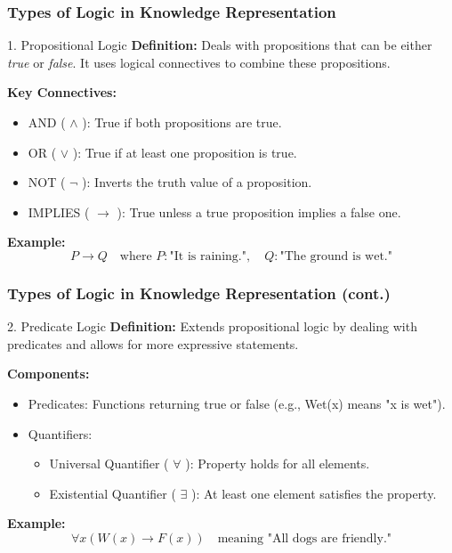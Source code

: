 \documentclass[aspectratio=169]{beamer}
\begin{document}
\begin{frame}[fragile]
    \frametitle{Types of Logic in Knowledge Representation}
    
    \begin{block}{1. Propositional Logic}
        \textbf{Definition:} Deals with propositions that can be either \textit{true} or \textit{false}. It uses logical connectives to combine these propositions.
        
        \textbf{Key Connectives:}
        \begin{itemize}
            \item AND ( $\land$ ): True if both propositions are true.
            \item OR ( $\lor$ ): True if at least one proposition is true.
            \item NOT ( $\neg$ ): Inverts the truth value of a proposition.
            \item IMPLIES ( $\rightarrow$ ): True unless a true proposition implies a false one.
        \end{itemize}
        
        \textbf{Example:}
        \[
        P \rightarrow Q \quad \text{where } P: \text{"It is raining."}, \quad Q: \text{"The ground is wet."}
        \]
    \end{block}
\end{frame}

\begin{frame}[fragile]
    \frametitle{Types of Logic in Knowledge Representation (cont.)}
    
    \begin{block}{2. Predicate Logic}
        \textbf{Definition:} Extends propositional logic by dealing with predicates and allows for more expressive statements.
        
        \textbf{Components:}
        \begin{itemize}
            \item Predicates: Functions returning true or false (e.g., Wet(x) means "x is wet").
            \item Quantifiers:
                \begin{itemize}
                    \item Universal Quantifier ( $\forall$ ): Property holds for all elements.
                    \item Existential Quantifier ( $\exists$ ): At least one element satisfies the property.
                \end{itemize}
        \end{itemize}
        
        \textbf{Example:}
        \[
        \forall x (W(x) \rightarrow F(x)) \quad \text{meaning "All dogs are friendly."}
        \]
    \end{block}
\end{frame}
\end{document}
